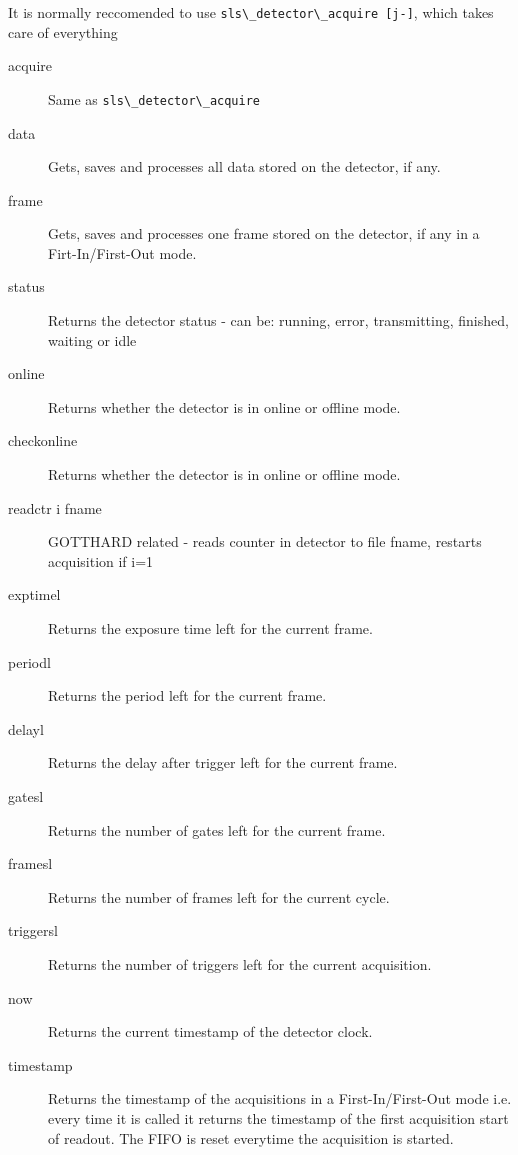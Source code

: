 \documentclass{article}
\begin{document}
It is normally reccomended to use \verb=sls\_detector\_acquire [j-]=, which takes care of everything
\begin{description}
\item[acquire] Same as \verb=sls\_detector\_acquire=
\item[data] Gets, saves and processes all data stored on the detector, if any.
\item[frame]  Gets, saves and processes one frame stored on the detector, if any in a Firt-In/First-Out mode.
\item[status] Returns the detector status - can be: running, error, transmitting, finished, waiting or idle
\item[online] Returns whether the detector is in online or offline mode.  
\item[checkonline] Returns whether the detector is in online or offline mode. 
\item[readctr i fname] GOTTHARD related - reads counter in detector to file fname, restarts acquisition if i=1
\item[exptimel]  Returns the exposure time left for the current frame.      
\item[periodl]  Returns the period left for the current frame.  
\item[delayl]    Returns the delay after trigger left for the current frame.  
\item[gatesl]     Returns the number of gates left for the current frame.  
\item[framesl]   Returns the number of frames left for the current cycle.  
\item[triggersl]      Returns the number of triggers left for the current acquisition. 
\item[now]  Returns the current timestamp of the detector clock.
\item[timestamp]  Returns the timestamp of the acquisitions in a First-In/First-Out mode i.e. every time it is called it returns the timestamp of the first acquisition start of readout. The FIFO is reset everytime the acquisition is started. 
\end{description}
\end{document}
